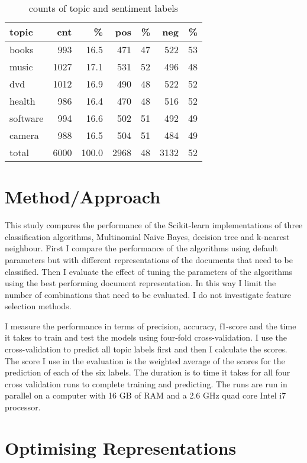 \documentclass[11pt]{article}
\begin{document}
\begin{table}[ht]\footnotesize
\caption{counts of topic and sentiment labels}
\label{tab:corpus}
\begin{tabular}{ l r r r r r r }
topic & cnt & \% & pos & \% & neg & \% \\
\hline
books & 993 & 16.5 & 471 & 47 & 522 & 53 \\
music & 1027 & 17.1 & 531 & 52 & 496 & 48 \\
dvd & 1012 & 16.9 & 490 & 48 & 522 & 52 \\
health & 986 & 16.4 & 470 & 48 & 516 & 52 \\
software & 994 & 16.6 & 502 & 51 & 492 & 49 \\
camera & 988 & 16.5 & 504 & 51 & 484 & 49 \\
\hline
total & 6000 & 100.0 & 2968 & 48 & 3132 & 52 \\
\end{tabular}

\end{table}

\section{Method/Approach}

This study compares the performance of the Scikit-learn implementations of three classification algorithms, Multinomial Naive Bayes, decision tree and k-nearest neighbour. First I compare the performance of the algorithms using default parameters but with different representations of the documents that need to be classified. Then I evaluate the effect of tuning the parameters of the algorithms using the best performing document representation. In this way I limit the number of combinations that need to be evaluated. I do not investigate feature selection methods.

I measure the performance in terms of precision, accuracy, f1-score and the time it takes to train and test the models using four-fold cross-validation. I use the cross-validation to predict all topic labels first and then I calculate the scores. The score I use in the evaluation is the weighted average of the scores for the prediction of each of the six labels. The duration is to time it takes for all four cross validation runs to complete training and predicting. The runs are run in parallel on a computer with 16 GB of RAM and a 2.6 GHz quad core Intel i7 processor.

\section{Optimising Representations}
\end{document}
